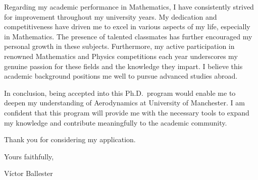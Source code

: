 \documentclass{letter}
\newcommand{\uni}{University of Manchester}
\begin{document}
\begin{letter}
  Regarding my academic performance in Mathematics, I have consistently strived for improvement throughout my university years. My dedication and competitiveness have driven me to excel in various aspects of my life, especially in Mathematics. The presence of talented classmates has further encouraged my personal growth in these subjects. Furthermore, my active participation in renowned Mathematics and Physics competitions each year underscores my genuine passion for these fields and the knowledge they impart. I believe this academic background positions me well to pursue advanced studies abroad.


  In conclusion, being accepted into this Ph.D.\ program would enable me to deepen my understanding of Aerodynamics at \uni. I am confident that this program will provide me with the necessary tools to expand my knowledge and contribute meaningfully to the academic community.

  Thank you for considering my application.
  \bigskip

  Yours faithfully,

  Víctor Ballester

\end{letter}
\end{document}
